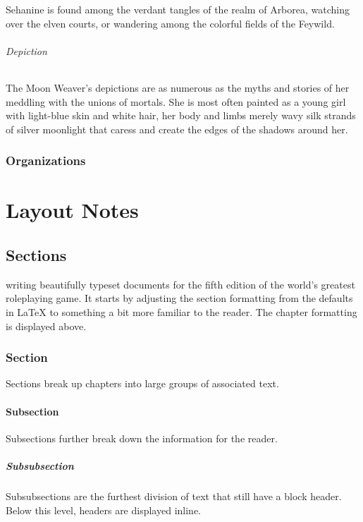 \documentclass[letterpaper,twocolumn,openany,nodeprecatedcode]{dndbook}
\begin{document}
Sehanine is found among the verdant tangles of the realm of Arborea, watching over the elven
courts, or wandering among the colorful fields of the Feywild.

\paragraph{Depiction}
The Moon Weaver’s depictions are as numerous as the myths and stories of her meddling with
the unions of mortals. She is most often painted as a young girl with light-blue skin and
white hair, her body and limbs merely wavy silk strands of silver moonlight that caress and
create the edges of the shadows around her.

\section{Organizations}

\part{Layout Notes}

\chapter{Sections}

 writing beautifully typeset documents for the fifth edition of the world's greatest roleplaying game. It starts by adjusting the section formatting from the defaults in \LaTeX{} to something a bit more familiar to the reader. The chapter formatting is displayed above.

\section{Section}
Sections break up chapters into large groups of associated text.

\subsection{Subsection}
Subsections further break down the information for the reader.

\subsubsection{Subsubsection}
Subsubsections are the furthest division of text that still have a block header. Below this level, headers are displayed inline.
\end{document}
